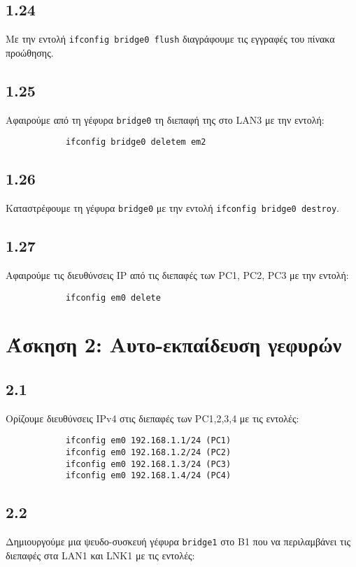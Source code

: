 \documentclass[a4paper, 12pt]{article}
\begin{document}
	\subsection*{1.24}
		Με την εντολή \verb|ifconfig bridge0 flush| διαγράφουμε τις εγγραφές του πίνακα προώθησης.
	
	\subsection*{1.25}
		Αφαιρούμε από τη γέφυρα \verb|bridge0| τη διεπαφή της στο LAN3 με την εντολή:
		
		\begin{verbatim}
			ifconfig bridge0 deletem em2
		\end{verbatim}
	
	\subsection*{1.26}
		Καταστρέφουμε τη γέφυρα \verb|bridge0| με την εντολή \verb|ifconfig bridge0 destroy|.
	
	\subsection*{1.27}
		Αφαιρούμε τις διευθύνσεις IP από τις διεπαφές των PC1, PC2, PC3 με την εντολή:
		
		\begin{verbatim}
			ifconfig em0 delete
		\end{verbatim} 

\section*{Άσκηση 2: Αυτο-εκπαίδευση γεφυρών}
	
	\subsection*{2.1}
		Ορίζουμε διευθύνσεις IPv4 στις διεπαφές των PC1,2,3,4 με τις εντολές:
		
		\begin{verbatim}
			ifconfig em0 192.168.1.1/24 (PC1)
			ifconfig em0 192.168.1.2/24 (PC2)
			ifconfig em0 192.168.1.3/24 (PC3)
			ifconfig em0 192.168.1.4/24 (PC4)
		\end{verbatim}
		
	\subsection*{2.2}
		Δημιουργούμε μια ψευδο-συσκευή γέφυρα \verb|bridge1| στο B1 που να περιλαμβάνει τις διεπαφές στα LAN1 και LNK1 με τις εντολές:
		
\end{document}
